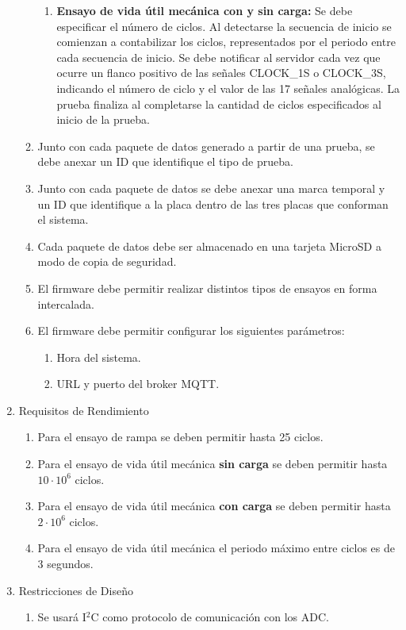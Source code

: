 \documentclass[11pt]{charter}
\begin{document}
\begin{enumerate}
\begin{enumerate}
\begin{enumerate}
		\item \textbf{Ensayo de vida útil mecánica con y sin carga:} Se debe especificar el número de ciclos. Al detectarse la secuencia de inicio se comienzan a contabilizar los ciclos, representados por el periodo entre cada secuencia de inicio. Se debe notificar al servidor cada vez que ocurre un flanco positivo de las señales CLOCK\_1S o CLOCK\_3S, indicando el número de ciclo y el valor de las 17 señales analógicas. La prueba finaliza al completarse la cantidad de ciclos especificados al inicio de la prueba.
		\end{enumerate}
	\item Junto con cada paquete de datos generado a partir de una prueba, se debe anexar un ID que identifique el tipo de prueba.
	\item Junto con cada paquete de datos se debe anexar una marca temporal y un ID que identifique a la placa dentro de las tres placas que conforman el sistema.
	\item Cada paquete de datos debe ser almacenado en una tarjeta MicroSD a modo de copia de seguridad.
	\item El firmware debe permitir realizar distintos tipos de ensayos en forma intercalada.
	\item El firmware debe permitir configurar los siguientes parámetros:
		\begin{enumerate}
		\item Hora del sistema.
		\item URL y puerto del broker MQTT.
		\end{enumerate}
	\end{enumerate}
\item Requisitos de Rendimiento
	\begin{enumerate}
	\item Para el ensayo de rampa se deben permitir hasta 25 ciclos.
	\item Para el ensayo de vida útil mecánica \textbf{sin carga} se deben permitir hasta $10 \cdot 10^6$ ciclos.
	\item Para el ensayo de vida útil mecánica \textbf{con carga} se deben permitir hasta $2 \cdot 10^6$ ciclos.
	\item Para el ensayo de vida útil mecánica el periodo máximo entre ciclos es de 3 segundos.
	\end{enumerate}
\item Restricciones de Diseño
	\begin{enumerate}
	\item Se usará I$^2$C como protocolo de comunicación con los ADC.

\end{enumerate}
\end{enumerate}
\end{document}
